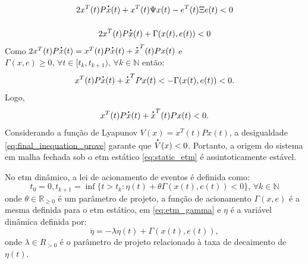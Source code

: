 \begin{gather}
  2x^T(t) P\dt{x}(t) + x^T(t)\Psi x(t) - e^T(t) \Xi e(t)  < 0 \notag \\[12pt]
  2x^T(t) P\dt{x}(t) + \Gamma(x(t), e(t)) < 0
  \label{eq:inequation_prove_4}
\end{gather} Como $2x^T(t) P\dt{x}(t) = x^T(t) P\dt{x}(t) + \dt{x}^T(t) P x(t)$ e $\Gamma(x, e) \geq 0, \, \forall t \in [t_k, t_{k+1}), \, \forall k \in \mathbb{N}$ então: \begin{equation}
  x^T(t) P\dt{x}(t) + \dt{x}^T P x(t)  < - \Gamma(x(t), e(t)) < 0.
\end{equation} Logo, \begin{equation}
  x^T(t) P\dt{x}(t) + \dt{x}^T(t) P x(t) < 0.
  \label{eq:final_inequation_prove}
\end{equation} Considerando a função de Lyapunov $V(x) = x^T(t)Px(t)$, a desigualdade \eqref{eq:final_inequation_prove} garante que $\dt{V}(x) < 0$. Portanto, a origem do sistema em malha fechada sob o \acrshort{etm} estático \eqref{eq:static_etm} é assintoticamente estável.

No \acrshort{etm} dinâmico, a lei de acionamento de eventos é definida como: \begin{equation} t_0 = 0, t_{k+1} = \inf \{t > t_k : \eta(t) + \theta \Gamma(x(t), e(t)) < 0 \}, \, \forall k \in \mathbb{N} \label{eq:dinamic_etm}\end{equation} onde $\theta \in \mathbb{R}_{\geq 0}$ é um parâmetro de projeto, a função de acionamento $\Gamma(x, e)$ é a mesma definida para o \acrshort{etm} estático, em \eqref{eq:etm_gamma} e $\eta$ é a variável dinâmica definida por: \begin{equation}  \dot{\eta} = - \lambda \eta(t) + \Gamma(x(t), e(t)), \label{eq:eta_dynamic}\end{equation} onde $\lambda \in R_{> 0} $ é o parâmetro de projeto relacionado à taxa de decaimento de $\eta(t)$.

